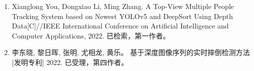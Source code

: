 \cleardoublepage
\vspace{-6mm}
\vspace{5mm}


\begin{enumerate}
	\item Xianglong You, Dongxiao Li, Ming Zhang. A Top-View Multiple People Tracking System
	based on Newest YOLOv5 and DeepSort Using
	Depth Data[C]//IEEE International Conference on Artificial Intelligence and Computer Applications, 2022. 已检索，第一作者。
	
	\item 李东晓, 黎日晖, 张明, 尤相龙, 黄乐。 基于深度图像序列的实时摔倒检测方法[发明专利] 2022. 已受理，第四作者。
	


\end{enumerate}
